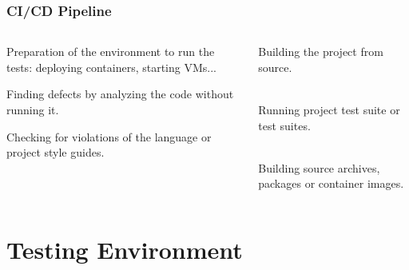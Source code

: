 \documentclass[aspectratio=169]{beamer}
\begin{document}
\begin{frame}
	\frametitle{CI/CD Pipeline}
	
\begin{columns}
\begin{column}{0.5\textwidth}
   	\begin{block}{\color{orange}{1. Testing environment}}
   		\vspace{1mm}
Preparation of the environment to run the tests: deploying containers, starting VMs...
	\end{block}
	\begin{block}{\color{orange}{2. Static Analysis}}
   		\vspace{1mm}
Finding defects by analyzing the code without running it.
     \end{block}
         \begin{block}{\color{orange}{3. Code style}}
   		\vspace{1mm}
Checking for violations of the language or project style guides.
     \end{block}
     
\end{column}
\begin{column}{0.5\textwidth}
\begin{block}{\color{orange}{4. Build}}
   		\vspace{1mm}
Building the project from source.\\~
     \end{block}
      \begin{block}{\color{orange}{5. Tests}}
   		\vspace{1mm}
Running project test suite or test suites.\\~
     \end{block}
      \begin{block}{\color{orange}{6. Packaging and Deployment}}
   		\vspace{1mm}
Building source archives, packages or container images.
     \end{block}
\end{column}
\end{columns}
\end{frame}

\section{Testing Environment}
\end{document}
